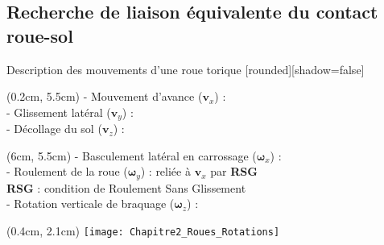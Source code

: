 \documentclass[french]{beamer}
\begin{document}
\subsection{Recherche de liaison équivalente du contact roue-sol}
\begin{frame}{Description des mouvements d'une roue torique}
[rounded][shadow=false]
{\scriptsize
\begin{textblock*}{6cm}(0.2cm, 5.5cm)
- Mouvement d’avance ($\boldsymbol{v}_x$) : \textcolor{vert}{\textbf{\CheckedBox}} \\
- Glissement latéral ($\boldsymbol{v}_y$) : \textcolor{red}{\textbf{\XBox}} \\
- Décollage du sol ($\boldsymbol{v}_z$) : \textcolor{red}{\textbf{\XBox}} \\
\end{textblock*}
\begin{textblock*}{6.5cm}(6cm, 5.5cm)
- Basculement latéral en carrossage ($\boldsymbol{\omega}_x$) : \textcolor{vert}{\textbf{\CheckedBox}}\\
- Roulement de la roue ($\boldsymbol{\omega}_y$) : reliée à $\boldsymbol{v}_x$ par \textbf{RSG}\\ 
\hspace{0.25cm}\textbf{RSG} : condition de Roulement Sans Glissement\\ 
- Rotation verticale de braquage ($\boldsymbol{\omega}_z$) : \textcolor{vert}{\textbf{\CheckedBox}}
\end{textblock*}
}

\begin{textblock*}{12cm}(0.4cm, 2.1cm)
\centering
\texttt{[image: Chapitre2\_Roues\_Rotations]}
\end{textblock*}

\end{frame}
\end{document}
